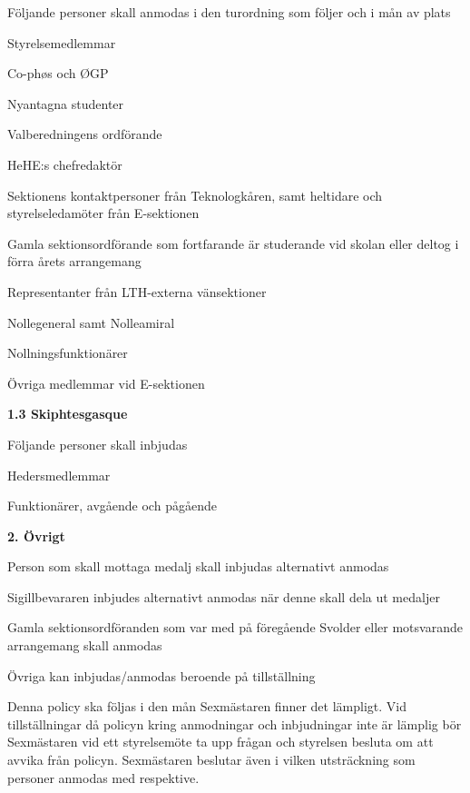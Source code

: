 \documentclass[../_main/handlingar.tex]{subfiles}
\begin{document}
Följande personer skall anmodas i den turordning som följer och i mån av plats

\begin{dashlist}
    \item Styrelsemedlemmar 
    \item Co-phøs och ØGP
    \item Nyantagna studenter
    \item Valberedningens ordförande
    \item HeHE:s chefredaktör
    \item Sektionens kontaktpersoner från Teknologkåren, samt heltidare och styrelseledamöter från E-sektionen
    \item Gamla sektionsordförande som fortfarande är studerande vid skolan eller deltog i förra årets arrangemang
    \item Representanter från LTH-externa vänsektioner
    \item Nollegeneral samt Nolleamiral
    \item Nollningsfunktionärer
    \item Övriga medlemmar vid E-sektionen
\end{dashlist}

{\large \textbf{1.3 Skiphtesgasque}}

Följande personer skall inbjudas
\begin{dashlist}
    \item Hedersmedlemmar
    \item Funktionärer, avgående och pågående
\end{dashlist}

{\large \textbf{2. Övrigt}}

\begin{dashlist}
    \item Person som skall mottaga medalj skall inbjudas alternativt anmodas
    \item Sigillbevararen inbjudes alternativt anmodas när denne skall dela ut medaljer
    \item Gamla sektionsordföranden som var med på föregående Svolder eller motsvarande arrangemang skall anmodas
    \item Övriga kan inbjudas/anmodas beroende på tillställning
\end{dashlist}

Denna policy ska följas i den mån Sexmästaren finner det lämpligt. Vid tillställningar då policyn kring anmodningar och inbjudningar inte är lämplig bör Sexmästaren vid ett styrelsemöte ta upp frågan och styrelsen besluta om att avvika från policyn. 
Sexmästaren beslutar även i vilken utsträckning som personer anmodas med respektive.
\end{document}
